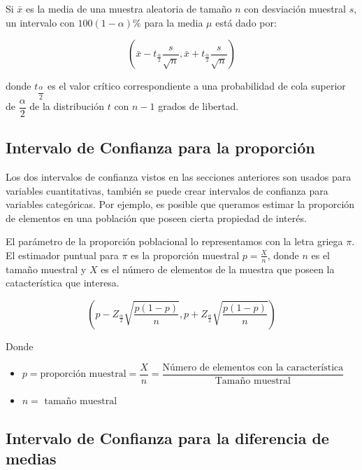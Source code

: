 \documentclass[
]{krantz}
\begin{document}
Si \(\bar{x}\) es la media de una muestra aleatoria de tamaño \(n\) con desviación muestral \(s\), un intervalo con \(100\left(1-\alpha\right)\%\) para la media \(\mu\) está dado por:

\begin{equation} 
  \left(\bar{x} - t_{\frac{\alpha}{2}}\dfrac{s}{\sqrt{n}}, \bar{x} + t_{\frac{\alpha}{2}}\dfrac{s}{\sqrt{n}}  \right)
  \label{eq:icmusd}
\end{equation}

donde \(t_{\dfrac{\alpha}{2}}\) es el valor crítico correspondiente a una probabilidad de cola superior de \(\dfrac{\alpha}{2}\) de la distribución \(t\) con \(n-1\) grados de libertad.

\hypertarget{intervalo-de-confianza-para-la-proporcion}{%
\subsection{Intervalo de Confianza para la proporción}\label{intervalo-de-confianza-para-la-proporcion}}

Los dos intervalos de confianza vistos en las secciones anteriores son usados para variables cuantitativas, también se puede crear intervalos de confianza para variables categóricas. Por ejemplo, es posible que queramos estimar la proporción de elementos en una población que poseen cierta propiedad de interés.

El parámetro de la proporción poblacional lo representamos con la letra griega \(\pi\). El estimador puntual para \(\pi\) es la proporción muestral \(p=\frac{X}{n}\), donde \(n\) es el tamaño muestral y \(X\) es el número de elementos de la muestra que poseen la catacterística que interesa.

\begin{equation} 
  \left(p - Z_{\frac{\alpha}{2}}\sqrt{\dfrac{p\left(1-p\right)}{n}}, p + Z_{\frac{\alpha}{2}}\sqrt{\dfrac{p\left(1-p\right)}{n}}  \right)
  \label{eq:icprop}
\end{equation}

Donde

\begin{itemize}
\item
  \(p=\text{proporción muestral}=\dfrac{X}{n} =\dfrac{\text{Número de elementos con la característica}}{\text{Tamaño muestral}}\)
\item
  \(n= \text{ tamaño muestral}\)
\end{itemize}

\hypertarget{intervalo-de-confianza-para-la-diferencia-de-medias}{%
\subsection{Intervalo de Confianza para la diferencia de medias}\label{intervalo-de-confianza-para-la-diferencia-de-medias}}
\end{document}
